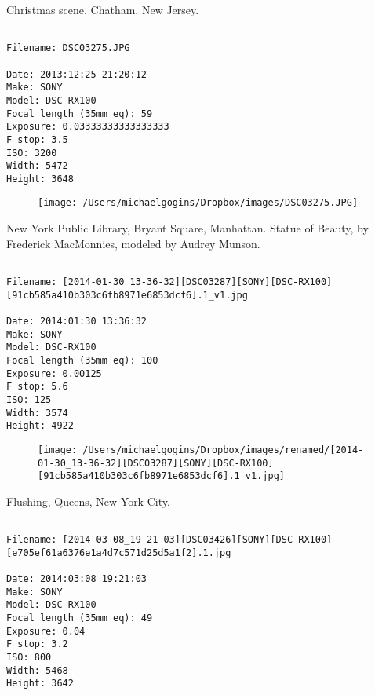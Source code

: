 \clearpage
\onecolumn
\noindent Christmas scene, Chatham, New Jersey.
\noindent
\begin{lstlisting}

Filename: DSC03275.JPG

Date: 2013:12:25 21:20:12
Make: SONY
Model: DSC-RX100
Focal length (35mm eq): 59
Exposure: 0.03333333333333333
F stop: 3.5
ISO: 3200
Width: 5472
Height: 3648
\end{lstlisting}
\clearpage

\begin{figure}
\texttt{[image: /Users/michaelgogins/Dropbox/images/DSC03275.JPG]}
\end{figure}
    
\clearpage
\onecolumn
\noindent New York Public Library, Bryant Square, Manhattan. Statue of Beauty, by Frederick MacMonnies, modeled by Audrey Munson.
\noindent
\begin{lstlisting}

Filename: [2014-01-30_13-36-32][DSC03287][SONY][DSC-RX100][91cb585a410b303c6fb8971e6853dcf6].1_v1.jpg

Date: 2014:01:30 13:36:32
Make: SONY
Model: DSC-RX100
Focal length (35mm eq): 100
Exposure: 0.00125
F stop: 5.6
ISO: 125
Width: 3574
Height: 4922
\end{lstlisting}
\clearpage

\begin{figure}
\texttt{[image: /Users/michaelgogins/Dropbox/images/renamed/[2014-01-30\_13-36-32][DSC03287][SONY][DSC-RX100][91cb585a410b303c6fb8971e6853dcf6].1\_v1.jpg]}
\end{figure}
    
\clearpage
\onecolumn
\noindent Flushing, Queens, New York City.
\noindent
\begin{lstlisting}

Filename: [2014-03-08_19-21-03][DSC03426][SONY][DSC-RX100][e705ef61a6376e1a4d7c571d25d5a1f2].1.jpg

Date: 2014:03:08 19:21:03
Make: SONY
Model: DSC-RX100
Focal length (35mm eq): 49
Exposure: 0.04
F stop: 3.2
ISO: 800
Width: 5468
Height: 3642
\end{lstlisting}
\clearpage


